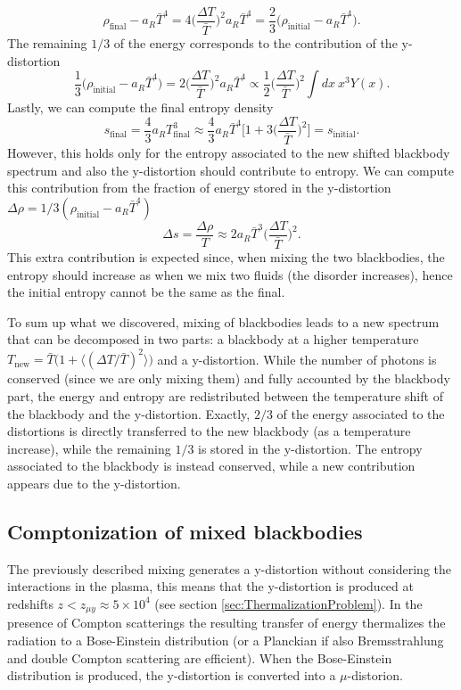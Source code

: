 $$\rho_\text{final}-a_R \bar T^4=4\bigg(\frac{\Delta T}{\bar T}\bigg)^2a_R\bar T^4=\frac{2}{3}\bigg(\rho_\text{initial}-a_R \bar T^4\bigg).$$
The remaining $1/3$ of the energy corresponds to the contribution of the y-distortion
$$\frac{1}{3}\bigg(\rho_\text{initial}-a_R \bar T^4\bigg)=2\bigg(\frac{\Delta T}{\bar T}\bigg)^2a_R\bar T^4\propto\frac{1}{2}\bigg(\frac{\Delta T}{\bar T}\bigg)^2\int dx\ x^3 Y(x).$$
Lastly, we can compute the final entropy density$$ s_\text{final}=\frac{4}{3}a_RT_\text{final}^3\approx\frac{4}{3}a_R \bar T^4\bigg[1+3\bigg(\frac{\Delta T}{\bar T}\bigg)^2\bigg]=s_\text{initial}.$$ However, this holds only for the entropy associated to the new shifted blackbody spectrum and also the y-distortion should contribute to entropy. We can compute this contribution from the fraction of energy stored in the y-distortion $\Delta \rho = 1/3(\rho_\text{initial}-a_R \bar T^4)$
$$\Delta s=\frac{\Delta \rho}{T}\approx 2a_R \bar T^3\bigg(\frac{\Delta T}{\bar T}\bigg)^2.$$
This extra contribution is expected since, when mixing the two blackbodies, the entropy should increase as when we mix two fluids (the disorder increases), hence the initial entropy cannot be the same as the final.

To sum up what we discovered, mixing of blackbodies leads to a new spectrum that can be decomposed in two parts: a blackbody at a higher temperature $T_\text{new}=\bar T\big(1+\langle(\Delta T/\bar T)^2\rangle\big)$ and a y-distortion. While the number of photons is conserved (since we are only mixing them) and fully accounted by the blackbody part, the energy and entropy are redistributed between the temperature shift of the blackbody and the y-distortion. Exactly, $2/3$ of the energy associated to the distortions is directly transferred to the new blackbody (as a temperature increase), while the remaining $1/3$ is stored in the y-distortion. The entropy associated to the blackbody is instead conserved, while a new contribution appears due to the y-distortion. 
\subsection{Comptonization of mixed blackbodies}
\label{sec:MixSD_Comportonization}
The previously described mixing generates a y-distortion without considering the interactions in the plasma, this means that the y-distortion is produced at redshifts $z<z_{\mu y}\approx 5\times 10^4$ (see section \ref{sec:ThermalizationProblem}). In the presence of Compton scatterings the resulting transfer of energy thermalizes the radiation to a Bose-Einstein distribution (or a Planckian if also Bremsstrahlung and double Compton scattering are efficient). When the Bose-Einstein distribution is produced, the y-distortion is converted into a $\mu$-distorion. 

